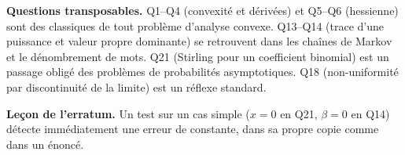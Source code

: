 \documentclass[11pt,a4paper]{article}
\begin{document}
\textbf{Questions transposables.} Q1--Q4 (convexité et dérivées) et Q5--Q6 (hessienne) sont des classiques de tout problème d'analyse convexe. Q13--Q14 (trace d'une puissance et valeur propre dominante) se retrouvent dans les chaînes de Markov et le dénombrement de mots. Q21 (Stirling pour un coefficient binomial) est un passage obligé des problèmes de probabilités asymptotiques. Q18 (non-uniformité par discontinuité de la limite) est un réflexe standard.

\textbf{Leçon de l'erratum.} Un test sur un cas simple (\(x=0\) en Q21, \(\beta=0\) en Q14) détecte immédiatement une erreur de constante, dans sa propre copie comme dans un énoncé.
\end{document}
